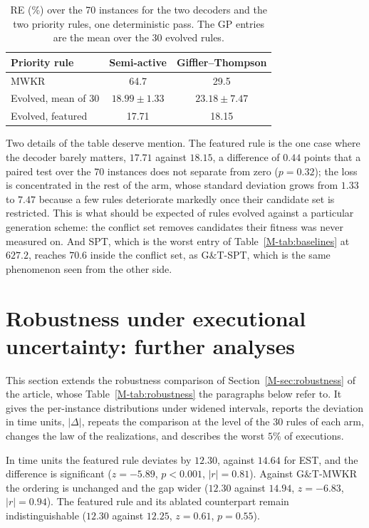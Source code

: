 \documentclass[11pt]{article}
\begin{document}
\begin{table}[!htb]
\centering\small
\caption{RE (\%) over the 70 instances for the two decoders and the
two priority rules, one deterministic pass. The GP entries are the mean
over the 30 evolved rules.}
\label{tab:decoder}
\begin{tabular}{lcc}
\toprule
Priority rule & Semi-active & Giffler--Thompson \\
\midrule
MWKR & 64.7 & 29.5 \\
Evolved, mean of 30 & $\mathbf{18.99} \pm 1.33$ & $23.18 \pm 7.47$ \\
Evolved, featured & 17.71 & 18.15 \\
\bottomrule
\end{tabular}
\end{table}

Two details of the table deserve mention. The featured rule is
the one case where the decoder barely matters, $17.71$ against $18.15$,
a difference of $0.44$ points that a paired test over the 70 instances
does not separate from zero ($p = 0.32$); the loss is concentrated in
the rest of the arm, whose standard deviation grows from $1.33$ to
$7.47$ because a few rules deteriorate markedly once their candidate set is restricted. This is what should be expected of rules evolved against a
particular generation scheme: the conflict set removes candidates their
fitness was never measured on. And SPT, which is the worst entry of
Table~\ref{M-tab:baselines} at $627.2$, reaches $70.6$ inside the
conflict set, as G\&T-SPT, which is the same phenomenon seen from the
other side.

\section{Robustness under executional uncertainty: further analyses}
\label{sec:robdetail}

This section extends the robustness comparison of Section~\ref{M-sec:robustness} of the article, whose Table~\ref{M-tab:robustness} the paragraphs below refer to. It gives the per-instance distributions under widened intervals, reports the deviation in time units, $|\Delta|$, repeats the comparison at the level of the 30 rules of each arm, changes the law of the realizations, and describes the worst $5\%$ of executions.

In time units the featured rule deviates by $12.30$, against $14.64$
for EST, and the difference is significant ($z=-5.89$, $p<0.001$,
$|r|=0.81$). Against G\&T-MWKR the ordering is unchanged and the gap
wider ($12.30$ against $14.94$, $z=-6.83$, $|r|=0.94$). The featured
rule and its ablated counterpart remain indistinguishable ($12.30$
against $12.25$, $z=0.61$, $p=0.55$).
\end{document}
